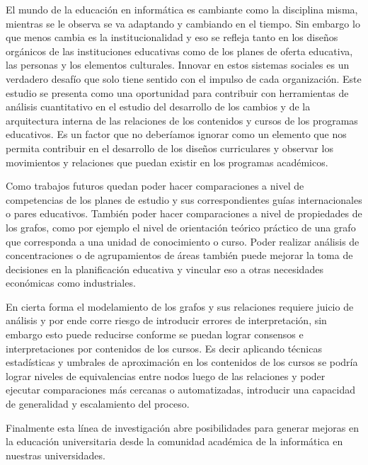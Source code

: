 El mundo de la educación en informática es cambiante como la disciplina misma, mientras se le observa se va adaptando y cambiando en el tiempo. Sin embargo lo que menos cambia es la institucionalidad y eso se refleja tanto en los diseños orgánicos de las instituciones educativas como de los planes de oferta educativa, las personas y los elementos culturales. Innovar en estos sistemas sociales es un verdadero desafío que solo tiene sentido con el impulso de cada organización. Este estudio se presenta como una oportunidad para contribuir con herramientas de análisis cuantitativo en el estudio del desarrollo de los cambios y de la arquitectura interna de las relaciones de los contenidos y cursos de los programas educativos. Es un factor que no deberíamos ignorar como un elemento que nos permita contribuir en el desarrollo de los diseños curriculares y observar los movimientos y relaciones que puedan existir en los programas académicos.

Como trabajos futuros quedan poder hacer comparaciones a nivel de competencias de los planes de estudio y sus correspondientes guías internacionales o pares educativos. También poder hacer comparaciones a nivel de propiedades de los grafos, como por ejemplo el nivel de orientación teórico práctico de una grafo que corresponda a una unidad de conocimiento o curso. Poder realizar análisis de concentraciones o de agrupamientos de áreas también puede mejorar la toma de decisiones en la planificación educativa y vincular eso a otras necesidades económicas como industriales.

En cierta forma el modelamiento de los grafos y sus relaciones requiere juicio de análisis y por ende corre riesgo de introducir errores de interpretación, sin embargo esto puede reducirse conforme se puedan lograr consensos e interpretaciones por contenidos de los cursos. Es decir aplicando técnicas estadísticas y umbrales de aproximación en los contenidos de los cursos se podría lograr niveles de equivalencias entre nodos luego de las relaciones y poder ejecutar comparaciones más cercanas o automatizadas, introducir una capacidad de generalidad y escalamiento del proceso. 

Finalmente esta línea de investigación abre posibilidades para generar mejoras en la educación universitaria desde la comunidad académica de la informática en nuestras universidades.